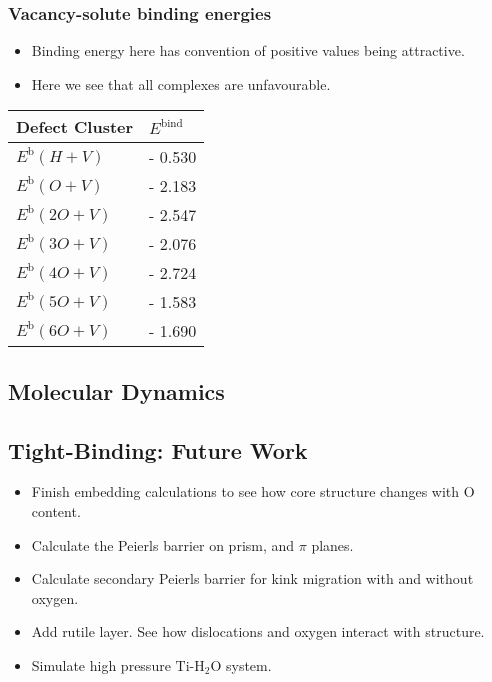 \documentclass[11pt]{article}
\begin{document}
\subsubsection*{Vacancy-solute binding energies}
\label{sec:org58773b7}

\begin{itemize}
\item Binding energy here has convention of positive values being
attractive.
\item Here we see that all complexes are unfavourable.
\end{itemize}
\begin{center}
\begin{tabular}{ll}
Defect Cluster & \(E^{\text{bind}}\)\\
\hline
\(E^{\text{b}}(H+V)\) & - 0.530\\
\(E^{\text{b}}(O+V)\) & - 2.183\\
\(E^{\text{b}}(2O+V)\) & - 2.547\\
\(E^{\text{b}}(3O+V)\) & - 2.076\\
\(E^{\text{b}}(4O+V)\) & - 2.724\\
\(E^{\text{b}}(5O+V)\) & - 1.583\\
\(E^{\text{b}}(6O+V)\) & - 1.690\\
\end{tabular}
\end{center}










\subsection*{Molecular Dynamics}
\label{sec:org4c730a7}


\subsection*{Tight-Binding: Future Work}
\label{sec:org92759d0}
\begin{itemize}
\item Finish embedding calculations to see how core structure changes
with O content.
\item Calculate the Peierls barrier on prism, and \(\pi\) planes.
\item Calculate secondary Peierls barrier for kink migration with and without
oxygen.
\item Add rutile layer. See how dislocations and oxygen interact with structure.
\item Simulate high pressure \(\text{Ti-H}_{2}\text{O}\) system.
\end{itemize}
\end{document}
